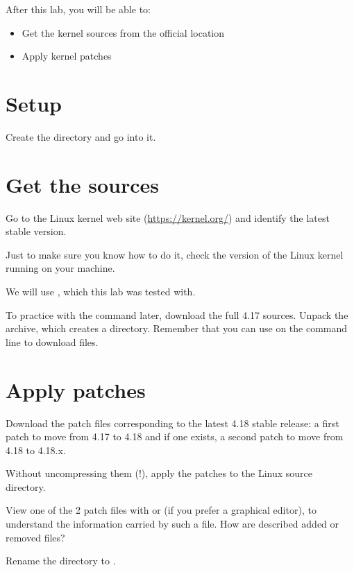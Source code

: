 
After this lab, you will be able to:
\begin{itemize}
\item Get the kernel sources from the official location
\item Apply kernel patches
\end{itemize}

\section{Setup}

Create the  directory and go into it.

\section{Get the sources}

Go to the Linux kernel web site (\url{https://kernel.org/}) and
identify the latest stable version.

Just to make sure you know how to do it, check the version of the
Linux kernel running on your machine.

We will use , which this lab was tested with.

To practice with the  command later, download the full 4.17
sources. Unpack the archive, which creates a 
directory. Remember that you can use  on the command
line to download files.

\section{Apply patches}

Download the patch files corresponding to the latest 4.18 stable
release: a first patch to move from 4.17 to 4.18 and if one exists,
a second patch to move from 4.18 to 4.18.x.

Without uncompressing them (!), apply the patches to the Linux
source directory.

View one of the 2 patch files with  or 
(if you prefer a graphical editor), to understand the information carried
by such a file. How are described added or removed files?

Rename the  directory to .
